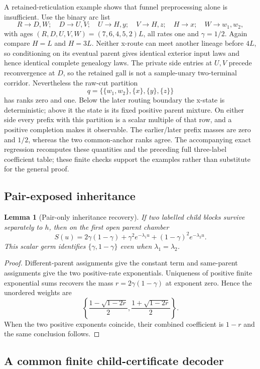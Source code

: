 \documentclass[11pt]{article}
\newtheorem{lemma}[theorem]{Lemma}
\begin{document}
A retained-reticulation example shows that funnel preprocessing alone is insufficient.  Use the binary arc list
\[
R\to D,W;\quad D\to U,V;\quad U\to H,y;\quad V\to H,z;
\quad H\to x;\quad W\to w_1,w_2,
\]
with ages $(R,D,U,V,W)=(7,6,4,5,2)L$, all rates one and $\gamma=1/2$.  Again compare $H=L$ and $H=3L$.  Neither x-route can meet another lineage before $4L$, so conditioning on its eventual parent gives identical exterior input laws and hence identical complete genealogy laws.  The private side entries at $U,V$ precede reconvergence at $D$, so the retained gall is not a sample-unary two-terminal corridor.  Nevertheless the raw-cut partition
\[
q=\{\{w_1,w_2\},\{x\},\{y\},\{z\}\}
\]
has ranks zero and one.  Below the later routing boundary the x-state is deterministic; above it the state is its fixed positive parent mixture.  On either side every prefix with this partition is a scalar multiple of that row, and a positive completion makes it observable.  The earlier/later prefix masses are zero and $1/2$, whereas the two common-anchor ranks agree.  The accompanying exact regression recomputes these quantities and the preceding full three-label coefficient table; these finite checks support the examples rather than substitute for the general proof.

\subsection{Pair-exposed inheritance}

\begin{lemma}[Pair-only inheritance recovery]
If two labelled child blocks survive separately to $h$, then on the first open parent chamber
\[
S(u)=2\gamma(1-\gamma)+\gamma^2e^{-\lambda_1u}+(1-\gamma)^2e^{-\lambda_2u}.
\]
This scalar germ identifies $\{\gamma,1-\gamma\}$ even when $\lambda_1=\lambda_2$.
\end{lemma}

\begin{proof}
Different-parent assignments give the constant term and same-parent assignments give the two positive-rate exponentials.  Uniqueness of positive finite exponential sums recovers the mass $r=2\gamma(1-\gamma)$ at exponent zero.  Hence the unordered weights are
\[
\left\{\frac{1-\sqrt{1-2r}}2,\frac{1+\sqrt{1-2r}}2\right\}.
\]
When the two positive exponents coincide, their combined coefficient is $1-r$ and the same conclusion follows.
\end{proof}

\subsection{A common finite child-certificate decoder}
\end{document}

